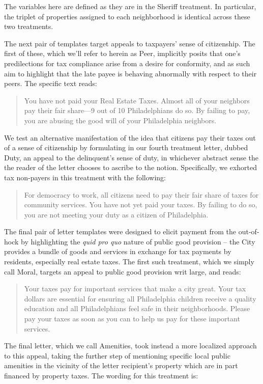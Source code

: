\documentclass[12pt,titlepage]{article}
\begin{document}
The variables here are defined as they are in the Sheriff treatment. 
In particular, the triplet of properties assigned to each neighborhood is 
identical across these two treatments. 

The next pair of templates target appeals to taxpayers' sense of citizenship. 
The first of these, which we'll refer to herein as \hypertarget{peer}{Peer},
implicitly posits that one's predilections for tax compliance arise from a 
desire for conformity, and as such aim to highlight that the late payee 
is behaving abnormally with respect to their peers. The specific text reads:

\blockquote{
	
	You have not paid your Real Estate Taxes. Almost all of your neighbors 
	pay their fair share—9 out of 10 Philadelphians do so. By failing to pay, 
	you are abusing the good will of your Philadelphia neighbors.
}
 
We test an alternative manifestation of the idea that citizens pay their 
taxes out of a sense of citizenship by formulating in our fourth treatment 
letter, dubbed \hypertarget{duty}{Duty}, an appeal to the delinquent’s sense 
of duty, in whichever abstract sense the the reader of the letter chooses 
to ascribe to the notion. Specifically, we exhorted tax non-payers in this 
treatment with the following:

\blockquote{
	For democracy to work, all citizens need to pay their fair share of taxes 
	for community services. You have not yet paid your taxes. By failing to 
	do so, you are not meeting your duty as a citizen of Philadelphia.
}

The final pair of letter templates were designed to elicit payment from 
the out-of-hock by highlighting the \textit{quid pro quo} nature of
public good provision – the City provides a bundle of goods and services
in exchange for tax payments by residents, especially real estate taxes.
The first such treatment, which we simply call \hypertarget{moral}{Moral},
targets an appeal to public good provision writ large, and reads:

\blockquote{
	Your taxes pay for important services that make a city great. Your 
	tax dollars are essential for ensuring all Philadelphia children 
	receive a quality education and all Philadelphians feel safe in 
	their neighborhoods. Please pay your taxes as soon as you can 
	to help us pay for these important services. 
}

The final letter, which we call \hypertarget{amenities}{Amenities},
took instead a more localized approach to this appeal, taking the 
further step of mentioning specific local public amenities in the 
vicinity of the letter recipient's property which are in part financed 
by property taxes. The wording for this treatment is:
\end{document}
